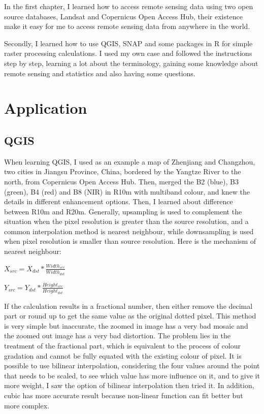 \documentclass[
  letterpaper,
  DIV=11,
  numbers=noendperiod]{scrreprt}
\begin{document}
In the first chapter, I learned how to access remote sensing data using
two open source databases, Landsat and Copernicus Open Access Hub, their
existence make it easy for me to access remote sensing data from
anywhere in the world.

Secondly, I learned how to use QGIS, SNAP and some packages in R for
simple raster processing calculations. I used my own case and followed
the instructions step by step, learning a lot about the terminology,
gaining some knowledge about remote sensing and statistics and also
having some questions.

\hypertarget{application}{%
\section{Application}\label{application}}

\hypertarget{qgis}{%
\subsection{QGIS}\label{qgis}}

When learning QGIS, I used as an example a map of Zhenjiang and
Changzhou, two cities in Jiangsu Province, China, bordered by the
Yangtze River to the north, from Copernicus Open Access Hub. Then,
merged the B2 (blue), B3 (green), B4 (red) and B8 (NIR) in R10m with
multiband colour, and knew the details in different enhancement options.
Then, I learned about difference between R10m and R20m. Generally,
upsampling is used to complement the situation when the pixel resolution
is greater than the source resolution, and a common interpolation method
is nearest neighbour, while downsampling is used when pixel resolution
is smaller than source resolution. Here is the mechanism of nearest
neighbour:

\(X_{src}=X_{dst}*\frac{Width_{src}}{Width_{dst}}\)

\(Y_{src}=Y_{dst}*\frac{Height_{src}}{Height_{dst}}\)

If the calculation results in a fractional number, then either remove
the decimal part or round up to get the same value as the original
dotted pixel. This method is very simple but inaccurate, the zoomed in
image has a very bad mosaic and the zoomed out image has a very bad
distortion. The problem lies in the treatment of the fractional part,
which is equivalent to the process of colour gradation and cannot be
fully equated with the existing colour of pixel. It is possible to use
bilinear interpolation, considering the four values around the point
that needs to be scaled, to see which value has more influence on it,
and to give it more weight, I saw the option of bilinear interpolation
then tried it. In addition, cubic has more accurate result because
non-linear function can fit better but more complex.
\end{document}
